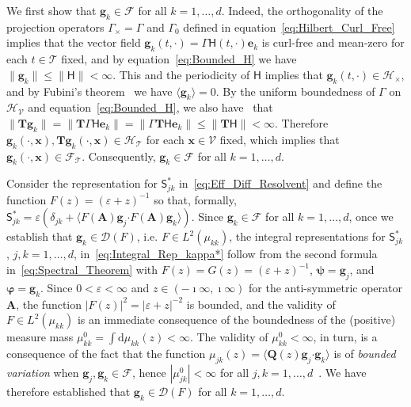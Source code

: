 \documentclass[leqno,onefignum,onetabnum]{siamltex1213}
\renewcommand{\d}{\mathrm{d}}
\newcommand{\Tb}{\mathbf{T}}
\newcommand{\Ab}{\mathbf{A}}
\newcommand{\Qb}{\mathbf{Q}}
\newcommand{\Tc}{\mathcal{T}}
\newcommand{\Vc}{\mathcal{V}}
\newcommand{\Hc}{\mathcal{H}}
\newcommand{\Fc}{\mathcal{F}}
\newcommand{\Hm}{\mathsf{H}}
\newcommand{\Sm}{\mathsf{S}}
\newcommand{\Ds}{\mathscr{D}}
\providecommand\bcdot{\boldsymbol{\cdot}}
\newcommand{\vecg}{\boldsymbol{g}}
\newcommand{\vecx}{\boldsymbol{x}}
\newcommand{\vece}{\boldsymbol{e}}
\newcommand{\vecpsi}{\boldsymbol{\psi}}
\newcommand{\vecvarphi}{\boldsymbol{\varphi}}
\begin{document}
We first show that $\vecg_k\in\Fc$ for
all $k=1,\ldots,d$. Indeed, the orthogonality of the
projection operators $\Gamma_\times=\Gamma$ and $\Gamma_0$ defined in
equation~\eqref{eq:Hilbert_Curl_Free} implies that the vector field
$\vecg_k(t,\cdot)=\Gamma\Hm(t,\cdot)\vece _k$ is curl-free and mean-zero
for each $t\in\Tc$ fixed, and by equation~\eqref{eq:Bounded_H} 
we have $\|\vecg_k\|\leq\|\Hm\|<\infty$. This and the periodicity of $\Hm$ implies
that $\vecg_k(t,\cdot)\in\Hc_\times$, and by Fubini's theorem~\cite{Folland:99}
we have $\langle\vecg_k\rangle=0$.  By the uniform boundedness of $\Gamma$ on
$\Hc_{\Vc}$ and equation~\eqref{eq:Bounded_H}, we also
have~\cite{Folland:99} that 
$\|\Tb\vecg_k\|=\|\Tb\Gamma\Hm\vece _k\|=\|\Gamma\Tb\Hm\vece _k\|\leq\|\Tb\Hm\|<\infty$.   
Therefore $\vecg_k(\cdot,\vecx),\Tb\vecg_k(\cdot,\vecx)\in\Hc_{\Tc}$ for each
$\vecx\in\Vc$ fixed, which implies that
$\vecg_k(\cdot,\vecx)\in\Fc_{\Tc}$. Consequently,  $\vecg_k\in\Fc$ for
all $k=1,\ldots,d$.



Consider the representation for $\Sm^*_{jk}$
in~\eqref{eq:Eff_Diff_Resolvent} and define the function 
$F(z)=(\varepsilon+z)^{-1}$ so that, formally,
$\Sm^*_{jk}=\varepsilon(\delta_{jk}+\langle F(\Ab)\vecg_j\bcdot F(\Ab)\vecg_k\rangle)$. Since
$\vecg_k\in\Fc$ for all $k=1,\ldots,d$, once we establish that
$\vecg_k\in\Ds(F)$, i.e. $F\in L^2(\mu_{kk})$, the integral representations
for $\Sm^*_{jk}$, $j,k=1,\ldots,d$, in~\eqref{eq:Integral_Rep_kappa*} follow
from the second formula in~\eqref{eq:Spectral_Theorem} with
$F(z)=G(z)=(\varepsilon+z)^{-1}$, $\vecpsi=\vecg_j$, and
$\vecvarphi=\vecg_k$. Since $0<\varepsilon<\infty$ and 
$z\in(-\imath\infty,\imath\infty)$ for the anti-symmetric operator $\Ab$, the function
$|F(z)|^2=|\varepsilon+z|^{-2}$ is bounded, and the validity of $F\in L^2(\mu_{kk})$ is
an immediate consequence of the boundedness of the (positive) measure
mass $\mu^0_{kk}=\int\d\mu_{kk}(z)<\infty$. The validity of $\mu^0_{kk}<\infty$, in turn,
is a consequence of the fact that the function
$\mu_{jk}(z)=\langle\Qb(z)\vecg_j\bcdot\vecg_k\rangle$ is of \emph{bounded
  variation} when $\vecg_j,\vecg_k\in\Fc$, hence
$|\mu^0_{jk}|<\infty$ for all $j,k=1,\ldots,d$~\cite{Stone:64}. We have therefore
established that $\vecg_k\in\Ds(F)$ for all $k=1,\ldots,d$.     
\end{document}

